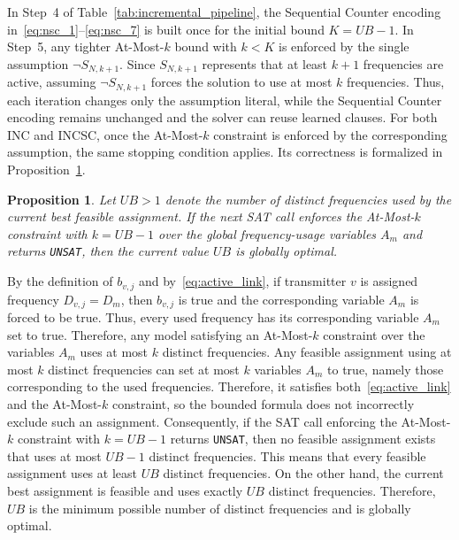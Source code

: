 \documentclass[letterpaper,journal]{IEEEtran}
\newtheorem{proposition}{Proposition}
\begin{document}
In Step~4 of Table~\ref{tab:incremental_pipeline}, the Sequential Counter encoding in~\eqref{eq:nsc_1}--\eqref{eq:nsc_7} is built once for the initial bound $K=UB-1$. In Step~5, any tighter At-Most-$k$ bound with $k<K$ is enforced by the single assumption $\neg S_{N,k+1}$. Since $S_{N,k+1}$ represents that at least $k+1$ frequencies are active, assuming $\neg S_{N,k+1}$ forces the solution to use at most $k$ frequencies. Thus, each iteration changes only the assumption literal, while the Sequential Counter encoding remains unchanged and the solver can reuse learned clauses. For both INC and INCSC, once the At-Most-$k$ constraint is enforced by the corresponding assumption, the same stopping condition applies. Its correctness is formalized in Proposition~\ref{prop:incremental_optimality}.
\begin{proposition}
\label{prop:incremental_optimality}
Let $UB>1$ denote the number of distinct frequencies used by the current best feasible assignment. 
If the next SAT call enforces the At-Most-$k$ constraint with $k=UB-1$ over the global frequency-usage variables $A_m$ and returns \texttt{UNSAT}, then the current value $UB$ is globally optimal.
\end{proposition}
\begin{IEEEproof}
By the definition of $b_{v,j}$ and by~\eqref{eq:active_link}, if transmitter $v$ is assigned frequency $D_{v,j}=D_m$, then $b_{v,j}$ is true and the corresponding variable $A_m$ is forced to be true.
Thus, every used frequency has its corresponding variable $A_m$ set to true.
Therefore, any model satisfying an At-Most-$k$ constraint over the variables $A_m$ uses at most $k$ distinct frequencies.
Any feasible assignment using at most $k$ distinct frequencies can set at most $k$ variables $A_m$ to true, namely those corresponding to the used frequencies. Therefore, it satisfies both~\eqref{eq:active_link} and the At-Most-$k$ constraint, so the bounded formula does not incorrectly exclude such an assignment.
Consequently, if the SAT call enforcing the At-Most-$k$ constraint with $k=UB-1$ returns \texttt{UNSAT}, then no feasible assignment exists that uses at most $UB-1$ distinct frequencies.
This means that every feasible assignment uses at least $UB$ distinct frequencies. On the other hand, the current best assignment is feasible and uses exactly $UB$ distinct frequencies. Therefore, $UB$ is the minimum possible number of distinct frequencies and is globally optimal.
\end{IEEEproof}
\end{document}
